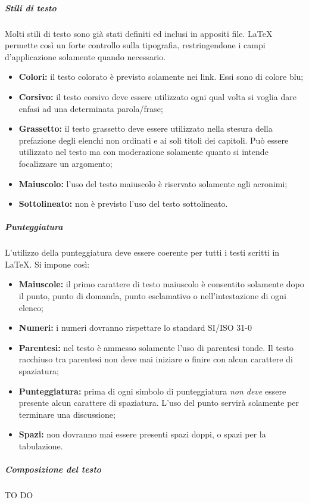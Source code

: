 				\subparagraph{Stili di testo}
				Molti stili di testo sono già stati definiti ed inclusi in appositi file. \LaTeX{} permette così un forte controllo sulla tipografia, restringendone i campi d'applicazione solamente quando necessario.  
				\begin{itemize}
					\item \textbf{Colori:} il testo colorato è previsto solamente nei link. Essi sono di colore blu;
					\item \textbf{Corsivo:} il testo corsivo deve essere utilizzato ogni qual volta si voglia dare enfasi ad una determinata parola/frase;
					\item \textbf{Grassetto:} il testo grassetto deve essere utilizzato nella stesura della prefazione degli elenchi non ordinati e ai soli titoli dei capitoli. Può essere utilizzato nel testo ma con moderazione solamente quanto si intende focalizzare un argomento;
					\item \textbf{Maiuscolo:} l'uso del testo maiuscolo è riservato solamente agli acronimi;
					\item \textbf{Sottolineato:} non è previsto l'uso del testo sottolineato.
				\end{itemize}

				\subparagraph{Punteggiatura}
				L'utilizzo della punteggiatura deve essere coerente per tutti i testi scritti in \LaTeX. Si impone così:
				\begin{itemize}
					\item \textbf{Maiuscole:} il primo carattere di testo maiuscolo è consentito solamente dopo il punto, punto di domanda, punto esclamativo o nell'intestazione di ogni elenco;
					\item \textbf{Numeri:} i numeri dovranno rispettare lo standard SI/ISO 31-0 
					\item \textbf{Parentesi:} nel testo è ammesso solamente l'uso di parentesi tonde. Il testo racchiuso tra parentesi non deve mai iniziare o finire con alcun carattere di spaziatura;
					\item \textbf{Punteggiatura:} prima di ogni simbolo di punteggiatura \emph{non deve} essere presente alcun carattere di spaziatura. L'uso del punto servirà solamente per terminare una discussione;
					\item \textbf{Spazi:} non dovranno mai essere presenti spazi doppi, o spazi per la tabulazione.
				\end{itemize}				
				
				\subparagraph{Composizione del testo} TO DO
				
